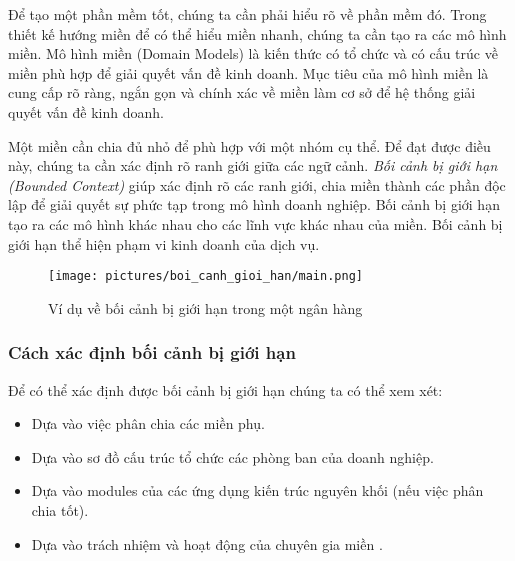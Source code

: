 
Để tạo một phần mềm tốt, chúng ta cần phải hiểu rõ về phần mềm đó. Trong thiết kế hướng miền để có thể hiểu miền nhanh, chúng ta cần tạo ra các mô hình miền. Mô hình miền (Domain Models) là kiến thức có tổ chức và có cấu trúc về miền phù hợp để giải quyết vấn đề kinh doanh. Mục tiêu của mô hình miền là cung cấp rõ ràng, ngắn gọn và chính xác về miền làm cơ sở để hệ thống giải quyết vấn đề kinh doanh.




Một miền cần chia đủ nhỏ để phù hợp với một nhóm cụ thể. Để đạt được điều này, chúng ta cần xác định rõ ranh giới giữa các ngữ cảnh. \emph{Bối cảnh bị giới hạn (Bounded Context)} giúp xác định rõ các ranh giới, chia miền thành các phần độc lập để giải quyết sự phức tạp trong mô hình doanh nghiệp. Bối cảnh bị giới hạn tạo ra các mô hình khác nhau cho các lĩnh vực khác nhau của miền. Bối cảnh bị giới hạn thể hiện phạm vi kinh doanh của dịch vụ.

\begin{figure}[H]

    \centering

    \texttt{[image: pictures/boi\_canh\_gioi\_han/main.png]}

    \caption{Ví dụ về bối cảnh bị giới hạn trong một ngân hàng}

\end{figure}

\subsubsection{Cách xác định bối cảnh bị giới hạn}

Để có thể xác định được bối cảnh bị giới hạn chúng ta có thể xem xét:

\begin{itemize}

    \item Dựa vào việc phân chia các miền phụ.

    \item Dựa vào sơ đồ cấu trúc tổ chức các phòng ban của doanh nghiệp.

    \item Dựa vào modules của các ứng dụng kiến trúc nguyên khối (nếu việc phân chia tốt).

    \item Dựa vào trách nhiệm và hoạt động của chuyên gia  miền   .

\end{itemize}

